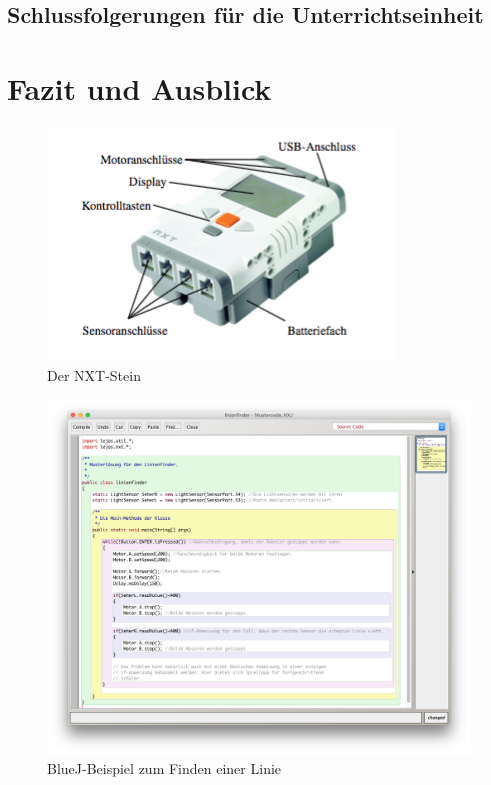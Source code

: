 \documentclass[paper=a4, DIV=13, BCOR=12mm, twoside=on, onecolumn=on, open = any, titlepage =on, parskip =half-, headsepline = on, footsepline = on, chapterprefix = on, sectionprefix = on, appendixprefix = off, fontsize = 11pt, numbers = noenddot, abstract = off]{scrreprt}
\begin{document}
\par \singlespacing
 \section{Schlussfolgerungen für die Unterrichtseinheit}
\onehalfspacing

\newpage
\chapter{Fazit und Ausblick}
\onehalfspacing

\begin{figure}[htb]
\centering
\includegraphics[scale=0.7]{images/NXT-Stein.png} 
\caption[Der NXT-Stein]{Der NXT-Stein \cite[S. 42]{berns:10}}
\label{fig:NXT Stein}
\end{figure}

\begin{figure}[htb]
\centering
\includegraphics[width=\textwidth]{images/linienfinder_bluej.png} 
\caption{BlueJ-Beispiel zum Finden einer Linie}
\label{fig:Bsp BlueJ Linienfinder}
\end{figure}
\end{document}
